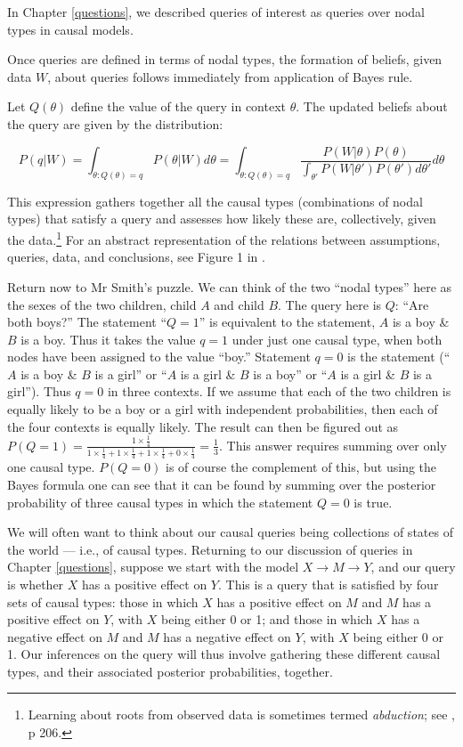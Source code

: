 \documentclass[
  12pt,
]{book}
\begin{document}
In Chapter \ref{questions}, we described queries of interest as queries over nodal types in causal models.

Once queries are defined in terms of nodal types, the formation of beliefs, given data \(W\), about queries follows immediately from application of Bayes rule.

Let \(Q(\theta)\) define the value of the query in context \(\theta\). The updated beliefs about the query are given by the distribution:

\[P(q | W) = \int_{\theta:Q(\theta) = q} P(\theta|W)d\theta =  \int_{\theta:Q(\theta) = q} \frac{P(W|\theta)P(\theta)}{\int_{\theta'}P(W|\theta')P(\theta')d\theta'}d\theta\]

This expression gathers together all the causal types (combinations of nodal types) that satisfy a query and assesses how likely these are, collectively, given the data.\footnote{Learning about roots from observed data is sometimes termed \emph{abduction}; see \citet{pearl2009causality}, p 206.} For an abstract representation of the relations between assumptions, queries, data, and conclusions, see Figure 1 in \citet{pearl2012causal}.

Return now to Mr Smith's puzzle. We can think of the two ``nodal types'' here as the sexes of the two children, child \(A\) and child \(B\). The query here is \(Q\): ``Are both boys?'' The statement ``\(Q=1\)'' is equivalent to the statement, \(A\) is a boy \& \(B\) is a boy. Thus it takes the value \(q=1\) under just one causal type, when both nodes have been assigned to the value ``boy.'' Statement \(q=0\) is the statement (``\(A\) is a boy \& \(B\) is a girl'' or ``\(A\) is a girl \& \(B\) is a boy'' or ``\(A\) is a girl \& \(B\) is a girl''). Thus \(q=0\) in three contexts. If we assume that each of the two children is equally likely to be a boy or a girl with independent probabilities, then each of the four contexts is equally likely.
The result can then be figured out as \(P(Q=1) = \frac{1\times \frac{1}{4}}{1\times \frac{1}{4} + 1\times \frac{1}{4}+1\times \frac{1}{4}+0\times \frac{1}{4}} = \frac{1}{3}\). This answer requires summing over only one causal type. \(P(Q=0)\) is of course the complement of this, but using the Bayes formula one can see that it can be found by summing over the posterior probability of three causal types in which the statement \(Q=0\) is true.

We will often want to think about our causal queries being collections of states of the world --- i.e., of causal types. Returning to our discussion of queries in Chapter \ref{questions}, suppose we start with the model \(X \rightarrow M \rightarrow Y\), and our query is whether \(X\) has a positive effect on \(Y\). This is a query that is satisfied by four sets of causal types: those in which \(X\) has a positive effect on \(M\) and \(M\) has a positive effect on \(Y\), with \(X\) being either 0 or 1; and those in which \(X\) has a negative effect on \(M\) and \(M\) has a negative effect on \(Y\), with \(X\) being either 0 or 1. Our inferences on the query will thus involve gathering these different causal types, and their associated posterior probabilities, together.
\end{document}
